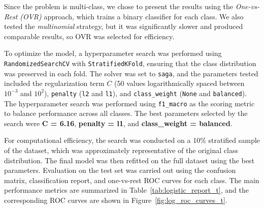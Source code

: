 Since the problem is multi-class, we chose to present the results using the 
\textit{One-vs-Rest (OVR)} approach, which trains a binary classifier for each class. 
We also tested the \textit{multinomial} strategy, but it was significantly slower and 
produced comparable results, so OVR was selected for efficiency.

To optimize the model, a hyperparameter search was performed using 
\texttt{RandomizedSearchCV} with \texttt{StratifiedKFold}, ensuring that the class 
distribution was preserved in each fold. The solver was set to \texttt{saga}, and the 
parameters tested included the regularization term $C$ (50 values logarithmically spaced 
between $10^{-3}$ and $10^2$), \texttt{penalty} (\texttt{l2} and \texttt{l1}), and 
\texttt{class\_weight} (\texttt{None} and \texttt{balanced}). The hyperparameter 
search was performed using \texttt{f1\_macro} as the scoring metric to balance 
performance across all classes. The best parameters selected by the search were 
\textbf{C = 6.16}, \textbf{penalty = l1}, and \textbf{class\_weight = balanced}.

For computational efficiency, the search was conducted on a 10\% stratified sample 
of the dataset, which was approximately representative of the original class distribution. The final 
model was then refitted on the full dataset using the best parameters. Evaluation on 
the test set was carried out using the confusion matrix, classification report, and 
one-vs-rest ROC curves for each class. The main performance metrics are summarized in 
Table~\ref{tab:logistic_report_t}, and the corresponding ROC curves are shown in 
Figure~\ref{fig:log_roc_curves_t}. 

